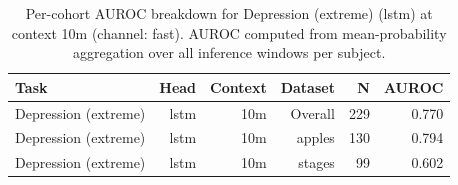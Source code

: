 \begin{table}[ht]
\centering
\caption{Per-cohort AUROC breakdown for Depression (extreme) (lstm) at context 10m (channel: fast). AUROC computed from mean-probability aggregation over all inference windows per subject.}
\label{tab:cohort_depression_extreme_binary_lstm_fast}
\begin{tabular}{lrrrrr}
\toprule
Task & Head & Context & Dataset & N & AUROC \\
\midrule
Depression (extreme) & lstm & 10m & Overall & 229 & 0.770 \\
Depression (extreme) & lstm & 10m & apples & 130 & 0.794 \\
Depression (extreme) & lstm & 10m & stages & 99 & 0.602 \\
\bottomrule
\end{tabular}
\end{table}